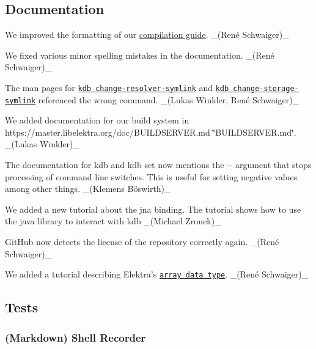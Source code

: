\subsection*{Documentation}


\begin{DoxyItemize}
\item We improved the formatting of our \hyperlink{doc_COMPILE_md}{compilation guide}. \+\_\+(René Schwaiger)\+\_\+
\item We fixed various minor spelling mistakes in the documentation. \+\_\+(René Schwaiger)\+\_\+
\item The man pages for \href{https://www.libelektra.org/manpages/kdb-change-resolver-symlink}{\tt {\ttfamily kdb change-\/resolver-\/symlink}} and \href{https://www.libelektra.org/manpages/kdb-change-storage-symlink}{\tt {\ttfamily kdb change-\/storage-\/symlink}} referenced the wrong command. \+\_\+(Lukas Winkler, René Schwaiger)\+\_\+
\item We added documentation for our build system in https\+://master.libelektra.\+org/doc/\+B\+U\+I\+L\+D\+S\+E\+R\+V\+ER.md \char`\"{}\+B\+U\+I\+L\+D\+S\+E\+R\+V\+E\+R.\+md\char`\"{}. \+\_\+(\+Lukas Winkler)\+\_\+
\item The documentation for {\ttfamily kdb} and {\ttfamily kdb set} now mentions the {\ttfamily -\/-\/} argument that stops processing of command line switches. This is useful for setting negative values among other things. \+\_\+(Klemens Böswirth)\+\_\+
\item We added a new tutorial about the jna binding. The tutorial shows how to use the java library to interact with kdb \+\_\+(\+Michael Zronek)\+\_\+
\item Git\+Hub now detects the license of the repository correctly again. \+\_\+(René Schwaiger)\+\_\+
\item We added a tutorial describing Elektra’s \href{https://www.libelektra.org/tutorials/arrays}{\tt array data type}. \+\_\+(René Schwaiger)\+\_\+
\end{DoxyItemize}

\subsection*{Tests}

\subsubsection*{(Markdown) Shell Recorder}


